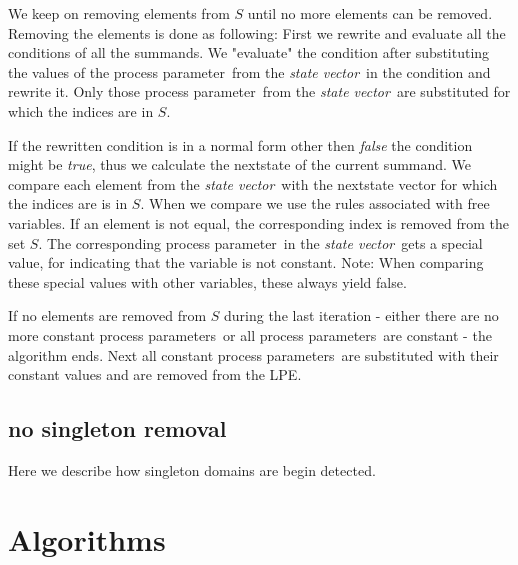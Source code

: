 \index{}\documentclass[a4paper,10pt]{article}
\theoremstyle{plain}
\theoremstyle{definition}
\newcommand{\pp}{process parameter}
\newcommand{\pps}{process parameters}
\newcommand{\ti}{\textit}
\newcommand{\sv}{\textit{state vector}}
\begin{document}
We keep on removing elements from $S$ until no more elements can be removed. Removing the elements is done as following:
First we rewrite and evaluate all the conditions of all the summands. We "evaluate" the condition after substituting the values of the \pp\ from the \sv\ in the condition and rewrite it. Only those \pp\ from the \sv\ are substituted for which the indices are in $S$. 

If the rewritten condition is in a normal form other then \ti{false} the condition might be \ti{true}, thus we calculate the nextstate of the current summand.  We compare each element from the \sv\ with the nextstate vector for which the indices are is in $S$. When we compare we use the rules associated with free variables. If an element is not equal, the corresponding index is removed from the set $S$. The corresponding \pp\ in the \sv\ gets a special value, for indicating that the variable is not constant. Note: When comparing these special values with other variables, these always yield false. 

If no elements are removed from $S$ during the last iteration - either there are no more constant \pps\ or all \pps\ are constant - the algorithm ends. Next all constant \pps\ are substituted with their constant values and are removed from the LPE. 

\subsection{no singleton removal}
Here we describe how singleton domains are begin detected.


\newpage
\section{Algorithms}
\end{document}
